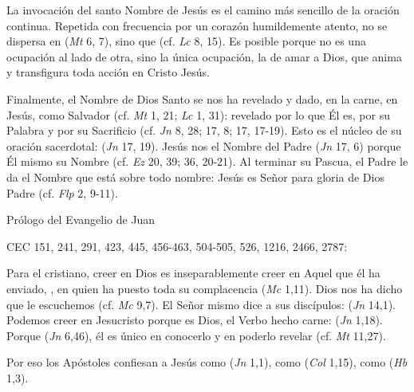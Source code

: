 	 La invocación del santo Nombre de Jesús es el camino más sencillo de la oración continua. Repetida con frecuencia por un corazón humildemente atento, no se dispersa en  (\emph{Mt} 6, 7), sino que  (cf. \emph{Lc} 8, 15). Es posible  porque no es una ocupación al lado de otra, sino la única ocupación, la de amar a Dios, que anima y transfigura toda acción en Cristo Jesús.
	
	 Finalmente, el Nombre de Dios Santo se nos ha revelado y dado, en la carne, en Jesús, como Salvador (cf. \emph{Mt} 1, 21; \emph{Lc} 1, 31): revelado por lo que Él es, por su Palabra y por su Sacrificio (cf. \emph{Jn} 8, 28; 17, 8; 17, 17-19). Esto es el núcleo de su oración sacerdotal:  (\emph{Jn} 17, 19). Jesús nos  el Nombre del Padre (\emph{Jn} 17, 6) porque  Él mismo su Nombre (cf. \emph{Ez} 20, 39; 36, 20-21). Al terminar su Pascua, el Padre le da el Nombre que está sobre todo nombre: Jesús es Señor para gloria de Dios Padre (cf. \emph{Flp} 2, 9-11).
	
	Prólogo del Evangelio de Juan
	
	CEC 151, 241, 291, 423, 445, 456-463, 504-505, 526, 1216, 2466, 2787:
	
	
	 Para el cristiano, creer en Dios es inseparablemente creer en Aquel que él ha enviado, , en quien ha puesto toda su complacencia (\emph{Mc} 1,11). Dios nos ha dicho que le escuchemos (cf. \emph{Mc} 9,7). El Señor mismo dice a sus discípulos:  (\emph{Jn} 14,1). Podemos creer en Jesucristo porque es Dios, el Verbo hecho carne:  (\emph{Jn} 1,18). Porque  (\emph{Jn} 6,46), él es único en conocerlo y en poderlo revelar (cf. \emph{Mt} 11,27).
	
	 Por eso los Apóstoles confiesan a Jesús como  (\emph{Jn} 1,1), como  (\emph{Col} 1,15), como  (\emph{Hb} 1,3).
	
